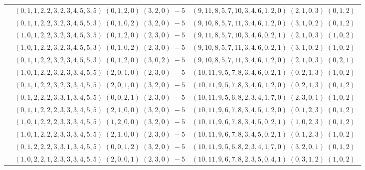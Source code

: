 \documentclass[11pt]{article}
\begin{document}
\begin{longtable}[l]{|c|c|c|}
 \cline{2-3} 
 & $(0 ,1 ,1 ,2 ,2 ,3 ,2 ,3 ,4 ,5 ,3 ,5) \;(0 ,1 ,2 ,0) \;(3 ,2 ,0) \;-5$ & $(9 ,11 ,8 ,5 ,7 ,10 ,3 ,4 ,6 ,1 ,2 ,0) \;(2 ,1 ,0 ,3) \;(0 ,1 ,2) \;$\\ 
 \cline{2-3} 
 & $(0 ,1 ,1 ,2 ,2 ,3 ,2 ,3 ,4 ,5 ,5 ,3) \;(0 ,1 ,0 ,2) \;(3 ,2 ,0) \;-5$ & $(9 ,10 ,8 ,5 ,7 ,11 ,3 ,4 ,6 ,1 ,2 ,0) \;(3 ,1 ,0 ,2) \;(0 ,1 ,2) \;$\\ 
 \cline{2-3} 
 & $(1 ,0 ,1 ,2 ,2 ,3 ,2 ,3 ,4 ,5 ,3 ,5) \;(0 ,1 ,2 ,0) \;(2 ,3 ,0) \;-5$ & $(9 ,11 ,8 ,5 ,7 ,10 ,3 ,4 ,6 ,0 ,2 ,1) \;(2 ,1 ,0 ,3) \;(1 ,0 ,2) \;$\\ 
 \cline{2-3} 
 & $(1 ,0 ,1 ,2 ,2 ,3 ,2 ,3 ,4 ,5 ,5 ,3) \;(0 ,1 ,0 ,2) \;(2 ,3 ,0) \;-5$ & $(9 ,10 ,8 ,5 ,7 ,11 ,3 ,4 ,6 ,0 ,2 ,1) \;(3 ,1 ,0 ,2) \;(1 ,0 ,2) \;$\\ 
 \cline{2-3} 
 & $(0 ,1 ,1 ,2 ,2 ,3 ,2 ,3 ,4 ,5 ,5 ,3) \;(0 ,1 ,2 ,0) \;(3 ,0 ,2) \;-5$ & $(9 ,10 ,8 ,5 ,7 ,11 ,3 ,4 ,6 ,1 ,2 ,0) \;(2 ,1 ,0 ,3) \;(0 ,2 ,1) \;$\\ 
 \cline{2-3} 
 & $(1 ,0 ,1 ,2 ,2 ,3 ,2 ,3 ,3 ,4 ,5 ,5) \;(2 ,0 ,1 ,0) \;(2 ,3 ,0) \;-5$ & $(10 ,11 ,9 ,5 ,7 ,8 ,3 ,4 ,6 ,0 ,2 ,1) \;(0 ,2 ,1 ,3) \;(1 ,0 ,2) \;$\\ 
 \cline{2-3} 
 & $(0 ,1 ,1 ,2 ,2 ,3 ,2 ,3 ,3 ,4 ,5 ,5) \;(2 ,0 ,1 ,0) \;(3 ,2 ,0) \;-5$ & $(10 ,11 ,9 ,5 ,7 ,8 ,3 ,4 ,6 ,1 ,2 ,0) \;(0 ,2 ,1 ,3) \;(0 ,1 ,2) \;$\\ 
 \cline{2-3} 
 & $(0 ,1 ,2 ,2 ,2 ,3 ,3 ,1 ,3 ,4 ,5 ,5) \;(0 ,0 ,2 ,1) \;(2 ,3 ,0) \;-5$ & $(10 ,11 ,9 ,5 ,6 ,8 ,2 ,3 ,4 ,1 ,7 ,0) \;(2 ,3 ,0 ,1) \;(1 ,0 ,2) \;$\\ 
 \cline{2-3} 
 & $(0 ,1 ,1 ,2 ,2 ,2 ,3 ,3 ,3 ,4 ,5 ,5) \;(2 ,1 ,0 ,0) \;(3 ,2 ,0) \;-5$ & $(10 ,11 ,9 ,6 ,7 ,8 ,3 ,4 ,5 ,1 ,2 ,0) \;(0 ,1 ,2 ,3) \;(0 ,1 ,2) \;$\\ 
 \cline{2-3} 
 & $(1 ,0 ,1 ,2 ,2 ,2 ,3 ,3 ,3 ,4 ,5 ,5) \;(1 ,2 ,0 ,0) \;(3 ,2 ,0) \;-5$ & $(10 ,11 ,9 ,6 ,7 ,8 ,3 ,4 ,5 ,0 ,2 ,1) \;(1 ,0 ,2 ,3) \;(0 ,1 ,2) \;$\\ 
 \cline{2-3} 
 & $(1 ,0 ,1 ,2 ,2 ,2 ,3 ,3 ,3 ,4 ,5 ,5) \;(2 ,1 ,0 ,0) \;(2 ,3 ,0) \;-5$ & $(10 ,11 ,9 ,6 ,7 ,8 ,3 ,4 ,5 ,0 ,2 ,1) \;(0 ,1 ,2 ,3) \;(1 ,0 ,2) \;$\\ 
 \cline{2-3} 
 & $(0 ,1 ,2 ,2 ,2 ,3 ,3 ,1 ,3 ,4 ,5 ,5) \;(0 ,0 ,1 ,2) \;(3 ,2 ,0) \;-5$ & $(10 ,11 ,9 ,5 ,6 ,8 ,2 ,3 ,4 ,1 ,7 ,0) \;(3 ,2 ,0 ,1) \;(0 ,1 ,2) \;$\\ 
 \cline{2-3} 
 & $(1 ,0 ,2 ,2 ,1 ,2 ,3 ,3 ,3 ,4 ,5 ,5) \;(2 ,0 ,0 ,1) \;(2 ,3 ,0) \;-5$ & $(10 ,11 ,9 ,6 ,7 ,8 ,2 ,3 ,5 ,0 ,4 ,1) \;(0 ,3 ,1 ,2) \;(1 ,0 ,2) \;$\\ 

\end{longtable}
\end{document}
